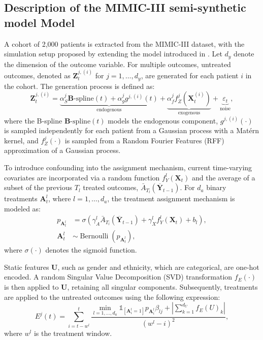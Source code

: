 \documentclass[10pt]{article} %
\begin{document}
\subsection{Description of the MIMIC-III semi-synthetic model Model}
\label{appendix:mimic_descrip}

A cohort of 2,000 patients is extracted from the MIMIC-III dataset, with the simulation setup proposed by \cite{Melnychuk2022CausalTF} extending the model introduced in \cite{schulam2017reliable}. Let \(d_y\) denote the dimension of the outcome variable. For multiple outcomes, untreated outcomes, denoted as \(\mathbf{Z}_t^{j,(i)}\) for \(j=1, \ldots, d_y\), are generated for each patient \(i\) in the cohort. The generation process is defined as:  
\begin{equation}
\mathbf{Z}_t^{j,(i)} = \underbrace{\alpha_S^j \mathbf{B}\text{-spline}(t) + \alpha_g^j g^{j,(i)}(t)}_{\text{endogenous}} + \underbrace{\alpha_f^j f_Z^j\left(\mathbf{X}_t^{(i)}\right)}_{\text{exogenous}} + \underbrace{\varepsilon_t}_{\text{noise}},
\end{equation}
where the B-spline \(\mathbf{B}\text{-spline}(t)\) models the endogenous component, \(g^{j,(i)}(\cdot)\) is sampled independently for each patient from a Gaussian process with a Matérn kernel, and \(f_Z^j(\cdot)\) is sampled from a Random Fourier Features (RFF) approximation of a Gaussian process.  

To introduce confounding into the assignment mechanism, current time-varying covariates are incorporated via a random function \(f_Y^l\left(\mathbf{X}_t\right)\) and the average of a subset of the previous \(T_l\) treated outcomes, \(\bar{A}_{T_l}\left(\overline{\mathbf{Y}}_{t-1}\right)\). For \(d_a\) binary treatments \(\mathbf{A}_t^l\), where \(l=1, \ldots, d_a\), the treatment assignment mechanism is modeled as:  
\begin{equation*}
\begin{aligned}
    p_{\mathbf{A}_t^l} &= \sigma\left(\gamma_A^l \bar{A}_{T_l}\left(\overline{\mathbf{Y}}_{t-1}\right) + \gamma_X^l f_Y^l\left(\mathbf{X}_t\right) + b_l\right), \\
    \mathbf{A}_t^l &\sim \operatorname{Bernoulli}\left(p_{\mathbf{A}_t^l}\right),
\end{aligned}
\end{equation*}
where \(\sigma(\cdot)\) denotes the sigmoid function.  

Static features \(\mathbf{U}\), such as gender and ethnicity, which are categorical, are one-hot encoded. A random Singular Value Decomposition (SVD) transformation \(f_E(\cdot)\) is then applied to \(\mathbf{U}\), retaining all singular components. Subsequently, treatments are applied to the untreated outcomes using the following expression:  
\begin{equation}
E^j(t) = \sum_{i=t-w^l}^t \frac{\min_{l=1, \ldots, d_a} \mathbb{1}_{\left[\mathbf{A}_i^l=1\right]} p_{\mathbf{A}_i^l} \beta_{lj} + \left|\sum_{k=1}^{d_U} f_E(U)_k\right|}{\left(w^l-i\right)^2},
\end{equation}
where \(w^l\) is the treatment window.  
\end{document}
